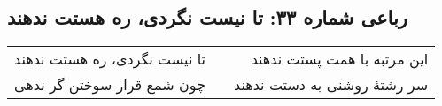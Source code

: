 \begin{center}
\section*{رباعی شماره ۳۳: تا نیست نگردی، ره هستت ندهند}
\label{sec:033}
\begin{longtable}{l p{0.5cm} r}
تا نیست نگردی، ره هستت ندهند
&&
این مرتبه با همت پستت ندهند
\\
چون شمع قرار سوختن گر ندهی
&&
سر رشتهٔ روشنی به دستت ندهند
\\
\end{longtable}
\end{center}
